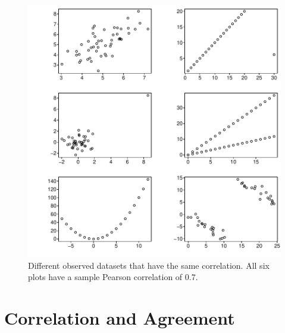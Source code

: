 \begin{Schunk}
\begin{figure}[htbp]
\centerline{\includegraphics[width=\maxwidth]{corr-corrplotb-1} }

\caption[Multiple datasets having same Pearson $r$]{Different observed datasets that have the same correlation.  All six plots have a sample Pearson correlation of $0.7$.}\label{fig:corr-corrplotb}
\end{figure}
\end{Schunk}


\clearpage
\section{Correlation and Agreement}

